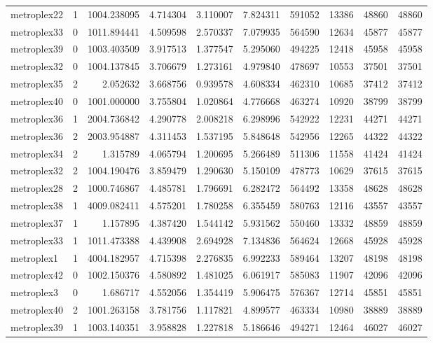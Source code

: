 \begin{longtable}{|l|r|r|r|r|r|r|r|r|r|}
metroplex22 & 1 & 1004.238095 & 4.714304 & 3.110007 & 7.824311 & 591052 & 13386 & 48860 & 48860 \\
metroplex33 & 0 & 1011.894441 & 4.509598 & 2.570337 & 7.079935 & 564590 & 12634 & 45877 & 45877 \\
metroplex39 & 0 & 1003.403509 & 3.917513 & 1.377547 & 5.295060 & 494225 & 12418 & 45958 & 45958 \\
metroplex32 & 0 & 1004.137845 & 3.706679 & 1.273161 & 4.979840 & 478697 & 10553 & 37501 & 37501 \\
metroplex35 & 2 & 2.052632 & 3.668756 & 0.939578 & 4.608334 & 462310 & 10685 & 37412 & 37412 \\
metroplex40 & 0 & 1001.000000 & 3.755804 & 1.020864 & 4.776668 & 463274 & 10920 & 38799 & 38799 \\
metroplex36 & 1 & 2004.736842 & 4.290778 & 2.008218 & 6.298996 & 542922 & 12231 & 44271 & 44271 \\
metroplex36 & 2 & 2003.954887 & 4.311453 & 1.537195 & 5.848648 & 542956 & 12265 & 44322 & 44322 \\
metroplex34 & 2 & 1.315789 & 4.065794 & 1.200695 & 5.266489 & 511306 & 11558 & 41424 & 41424 \\
metroplex32 & 2 & 1004.190476 & 3.859479 & 1.290630 & 5.150109 & 478773 & 10629 & 37615 & 37615 \\
metroplex28 & 2 & 1000.746867 & 4.485781 & 1.796691 & 6.282472 & 564492 & 13358 & 48628 & 48628 \\
metroplex38 & 1 & 4009.082411 & 4.575201 & 1.780258 & 6.355459 & 580763 & 12116 & 43557 & 43557 \\
metroplex37 & 1 & 1.157895 & 4.387420 & 1.544142 & 5.931562 & 550460 & 13332 & 48859 & 48859 \\
metroplex33 & 1 & 1011.473388 & 4.439908 & 2.694928 & 7.134836 & 564624 & 12668 & 45928 & 45928 \\
metroplex1 & 1 & 4004.182957 & 4.715398 & 2.276835 & 6.992233 & 589464 & 13207 & 48198 & 48198 \\
metroplex42 & 0 & 1002.150376 & 4.580892 & 1.481025 & 6.061917 & 585083 & 11907 & 42096 & 42096 \\
metroplex3 & 0 & 1.686717 & 4.552056 & 1.354419 & 5.906475 & 576367 & 12714 & 45851 & 45851 \\
metroplex40 & 2 & 1001.263158 & 3.781756 & 1.117821 & 4.899577 & 463334 & 10980 & 38889 & 38889 \\
metroplex39 & 1 & 1003.140351 & 3.958828 & 1.227818 & 5.186646 & 494271 & 12464 & 46027 & 46027 \\

\end{longtable}
